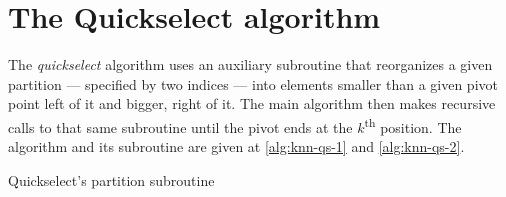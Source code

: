 \chapter{The Quickselect algorithm}
\label{app:qs}

The \emph{quickselect} algorithm uses an auxiliary subroutine that reorganizes a given partition --- specified by two indices --- into elements smaller than a given pivot point left of it and bigger, right of it. The main algorithm then makes recursive calls to that same subroutine until the pivot ends at the $k$\textsuperscript{th} position. The algorithm and its subroutine are given at \ref{alg:knn-qs-1} and \ref{alg:knn-qs-2}.

\begin{center}
\begin{algorithm}[H]
 \DontPrintSemicolon
 \caption{Quickselect's partition subroutine}
 \label{alg:knn-qs-2}
\end{algorithm}
\end{center}

